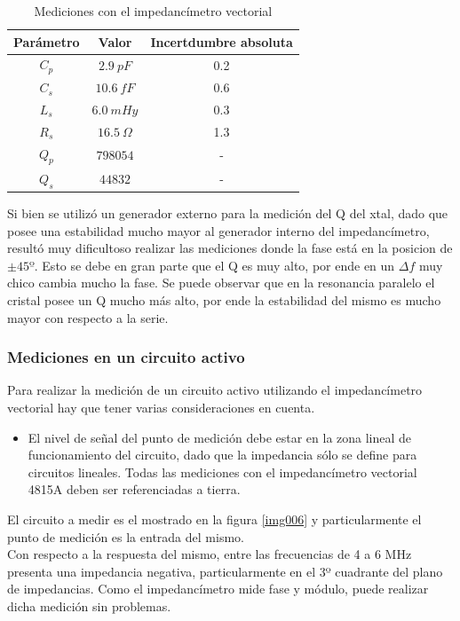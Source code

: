 \documentclass[a4paper,10pt]{article}
\begin{document}
		\begin{table}[!htp]
			\centering
			\begin{tabular}{|c|c|c|}
				\hline
				Parámetro & Valor & Incertdumbre absoluta \\
				\hline
				$C_p$ & $2.9~pF$ & 0.2 \\
				\hline
				$C_s$ & $10.6~fF$ & 0.6 \\ 
				\hline
				$L_s$ & $6.0~mHy$ & 0.3 \\
				\hline
				$R_s$ & $16.5~\Omega$ & 1.3 \\ 
				\hline									
				$Q_p$ & $798054$ & - \\
				\hline
				$Q_s$ & $44832$  & - \\
				\hline
			\end{tabular}
			\caption{Mediciones con el impedancímetro vectorial} \label{tab004}
		\end{table}	

		\indent Si bien se utilizó un generador externo para la medición del Q 
		del xtal, dado que posee una estabilidad mucho mayor al generador 
		interno del impedancímetro, resultó muy dificultoso realizar las 
		mediciones donde la fase está en la posicion de $\pm45º$. Esto se debe 
		en gran parte que el Q es muy alto, por ende en un $\Delta f$ muy chico 
		cambia mucho la fase. Se puede observar que en la resonancia paralelo el
		cristal posee un Q mucho más alto, por ende la estabilidad del mismo es 
		mucho mayor con respecto a la serie.

		\subsubsection{Mediciones en un circuito activo}
		
		\indent Para realizar la medición de un circuito activo utilizando el 
		impedancímetro vectorial hay que tener varias consideraciones en cuenta.
		
		\begin{itemize}
			\item El nivel de señal del punto de medición debe estar en la zona 
			lineal de funcionamiento del circuito, dado que la impedancia sólo 
			se define para circuitos lineales.
			\indent Todas las mediciones con el impedancímetro vectorial 4815A 
			deben ser referenciadas a tierra.
		\end{itemize}
		
		\indent El circuito a medir es el mostrado en la figura \ref{img006} y 
		particularmente el punto de medición es la entrada del mismo. \\
		\indent Con respecto a la respuesta del mismo, entre las frecuencias 
		de 4 a 6 MHz presenta una impedancia negativa, particularmente en el 3º
		cuadrante del plano de impedancias. Como el impedancímetro mide fase y
		módulo, puede realizar dicha medición sin problemas.
		
\end{document}
